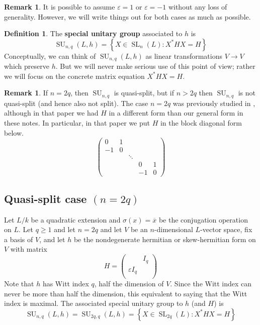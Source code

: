 \documentclass[12pt]{article}
\theoremstyle{definition}
\newtheorem{definition}[theorem]{Definition}
\newtheorem{remark}[theorem]{Remark}
\newcommand{\sig}{\sigma}
\newcommand{\eps}{\varepsilon}
\newcommand{\lb}{\left\{}
\newcommand{\rb}{\right\}}
\newcommand{\tbf}{\textbf}
\newcommand{\ov}{\overline}
\DeclareMathOperator{\SL}{SL}
\DeclareMathOperator{\SU}{SU}
\begin{document}
\begin{remark}
It is possible to assume $\eps = 1$ or $\eps = -1$ without any loss of generality. However, we will write things out for both cases as much as possible.
\end{remark}

\begin{definition}
The \tbf{special unitary group} associated to $h$ is
\[
	\SU_{n,q}(L,h) = \lb X \in \SL_{n}(L) : X^*H X = H \rb
\]
Conceptually, we can think of $\SU_{n,q}(L,h)$ as linear transformations $V \to V$ which preserve $h$. But we will never make serious use of this point of view; rather we will focus on the concrete matrix equation $X^*HX = H$.
\end{definition}

\begin{remark}
If $n=2q$, then $\SU_{n,q}$ is quasi-split, but if $n > 2q$ then $\SU_{n,q}$ is not quasi-split (and hence also not split). The case $n=2q$ was previously studied in \cite{Rapinchuk-Ruiter}, although in that paper we had $H$ in a different form than our general form in these notes. In particular, in that paper we put $H$ in the block diagonal form below.
\[
	\begin{pmatrix}
		0 & 1 \\
		-1 & 0 \\
		&& \ddots \\
		&&& 0 & 1 \\
		&&& -1 & 0
	\end{pmatrix}
\]
\end{remark}

\subsection{Quasi-split case $(n=2q)$}

Let $L/k$ be a quadratic extension and $\sig(x) = \ov x$ be the conjugation operation on $L$. Let $q \ge 1$ and let $n = 2q$ and let $V$ be an $n$-dimensional $L$-vector space, fix a basis of $V$, and let $h$ be the nondegenerate hermitian or skew-hermitian form on $V$ with matrix
\[
H =
	\begin{pmatrix}
		& I_q \\
		\eps I_q \\
	\end{pmatrix}
\]
Note that $h$ has Witt index $q$, half the dimension of $V$. Since the Witt index can never be more than half the dimension, this equivalent to saying that the Witt index is maximal. The associated special unitary group to $h$ (and $H$) is
\[
	\SU_{n,q}(L,h) = \SU_{2q,q}(L,h) = \lb X \in \SL_{2q}(L) : X^*H X = H \rb
\]
\end{document}
